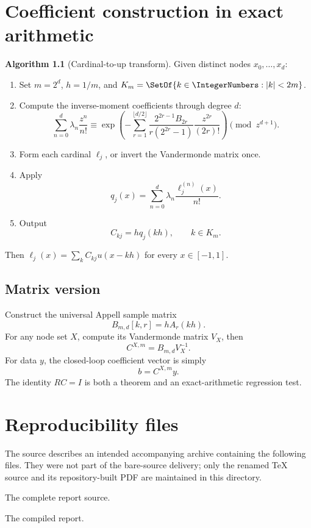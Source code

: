 \documentclass[11pt,oneside]{book}
\theoremstyle{definition}
\newtheorem{algorithm}[theorem]{Algorithm}
\theoremstyle{remark}
\newcommand{\RepoPath}[1]{\texttt{#1}}
\begin{document}
\chapter{Coefficient construction in exact arithmetic}
\label{app:algorithm}

\begin{algorithm}[Cardinal-to-up transform]
\label{alg:cardinal-to-up}
Given distinct nodes \(x_0,\ldots,x_d\):
\begin{enumerate}
\item Set \(m=2^d\), \(h=1/m\), and \(K_m=\SetOf{k\in\IntegerNumbers:|k|<2m}\).
\item Compute the inverse-moment coefficients through degree \(d\):
\[
 \sum_{n=0}^{d}\lambda_n\frac{z^n}{n!}
 \equiv
 \exp\!\left(-\sum_{r=1}^{\lfloor d/2\rfloor}
 \frac{2^{2r-1}B_{2r}}{r(2^{2r}-1)}
 \frac{z^{2r}}{(2r)!}\right)
 \pmod{z^{d+1}}.
\]
\item Form each cardinal \(\ell_j\), or invert the Vandermonde matrix once.
\item Apply
\[
 q_j(x)=\sum_{n=0}^{d}\lambda_n\frac{\ell_j^{(n)}(x)}{n!}.
\]
\item Output
\[
 C_{kj}=h q_j(kh),\qquad k\in K_m.
\]
\end{enumerate}
Then \(\ell_j(x)=\sum_kC_{kj}u(x-kh)\) for every \(x\in[-1,1]\).
\end{algorithm}

\section{Matrix version}
Construct the universal Appell sample matrix
\[
 B_{m,d}[k,r]=hA_r(kh).
\]
For any node set \(X\), compute its Vandermonde matrix \(V_X\), then
\[
 C^{X,m}=B_{m,d}V_X^{-1}.
\]
For data \(y\), the closed-loop coefficient vector is simply
\[
 b=C^{X,m}y.
\]
The identity \(RC=I\) is both a theorem and an exact-arithmetic regression test.

\chapter{Reproducibility files}
\label{app:reproducibility}
The source describes an intended accompanying archive containing the following
files.  They were not part of the bare-source delivery; only the renamed TeX
source and its repository-built PDF are maintained in this directory.
\begin{description}[style=nextline]
\item[\RepoPath{Rvachev\_Lagrange\_Loop\_Report\_v6.tex}]
The complete report source.
\item[\RepoPath{Rvachev\_Lagrange\_Loop\_Report\_v6.pdf}]
The compiled report.
\end{description}
\end{document}
